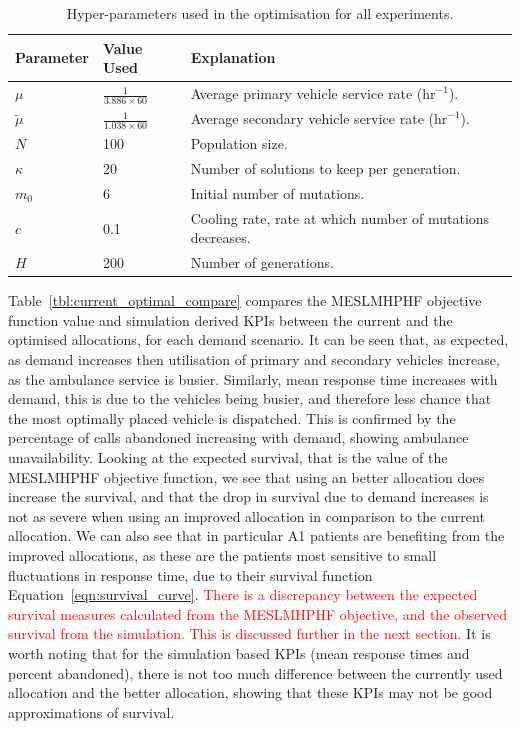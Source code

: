 \documentclass[numbers,webpdf,imaman]{ima-authoring-template}%
\begin{document}
\begin{table}
\centering
\begin{tabular}{lll}
\toprule
Parameter & Value Used & Explanation \\
\midrule
$\mu$ & $\frac{1}{3.886 \times 60}$ & Average primary vehicle service rate ($\text{hr}^{-1}$).\\
$\tilde{\mu}$ & $\frac{1}{1.038 \times 60}$ & Average secondary vehicle service rate ($\text{hr}^{-1}$).\\
$N$ & 100 & Population size.\\
$\kappa$ & 20 & Number of solutions to keep per generation.\\
$m_0$ & 6 & Initial number of mutations.\\
$c$ & 0.1 & Cooling rate, rate at which number of mutations decreases.\\
$H$ & 200 & Number of generations.\\
\bottomrule
\end{tabular}
\caption{Hyper-parameters used in the optimisation for all experiments.}
\label{tbl:hyperparameters}
\end{table}

Table~\ref{tbl:current_optimal_compare} compares the MESLMHPHF objective
function value and simulation derived KPIs between the current and the optimised
allocations, for each demand scenario. It can be seen that, as expected, as
demand increases then utilisation of primary and secondary vehicles increase, as
the ambulance service is busier. Similarly, mean response time increases with
demand, this is due to the vehicles being busier, and therefore less chance that
the most optimally placed vehicle is dispatched. This is confirmed by the
percentage of calls abandoned increasing with demand, showing ambulance
unavailability.
Looking at the expected survival, that is the value of the MESLMHPHF objective
function, we see that using an better allocation does increase the survival,
and that the drop in survival due to demand increases is not as severe when
using an improved allocation in comparison to the current allocation. We can
also see that in particular A1 patients are benefiting from the improved
allocations, as these are the patients most sensitive to small fluctuations in
response time, due to their survival function Equation~\ref{eqn:survival_curve}.
\textcolor{red}{There is a discrepancy between the expected survival
measures calculated from the MESLMHPHF objective, and the observed survival from
the simulation. This is discussed further in the next section.}
It is worth noting that for the simulation based KPIs (mean response times and
percent abandoned), there is not too much
difference between the currently used allocation and the better allocation,
showing that these KPIs may not be good approximations of survival.
\end{document}
